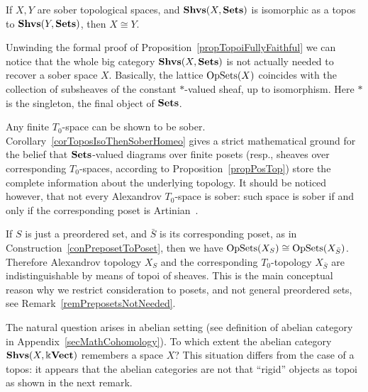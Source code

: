 \begin{cor}\label{corToposIsoThenSoberHomeo}
If $X,Y$ are sober topological spaces, and $\mathbf{Shvs}(X,\mathbf{Sets})$ is isomorphic as a topos to $\mathbf{Shvs}(Y,\mathbf{Sets})$, then $X\cong Y$.
\end{cor}

\begin{rem}\label{remRecoverXfromTopos}
Unwinding the formal proof of Proposition~\ref{propTopoiFullyFaithful} we can notice that the whole big category $\mathbf{Shvs}(X,\mathbf{Sets})$ is not actually needed to recover a sober space $X$. Basically, the lattice $\operatorname{OpSets}(X)$ coincides with the collection of subsheaves of the constant $\ast$-valued sheaf, up to isomorphism. Here $\ast$ is the singleton, the final object of $\mathbf{Sets}$.
\end{rem}

\begin{rem}\label{remFiniteT0SpaceSetSheaves}
Any finite $T_0$-space can be shown to be sober. Corollary~\ref{corToposIsoThenSoberHomeo} gives a strict mathematical ground for the belief that $\mathbf{Sets}$-valued diagrams over finite posets (resp., sheaves over corresponding $T_0$-spaces, according to Proposition~\ref{propPosTop}) store the complete information about the underlying topology. It should be noticed however, that not every Alexandrov $T_0$-space is sober: such space is sober if and only if the corresponding poset is Artinian~\cite[Thm.C.6]{Lindenhovius}.
\end{rem}

\begin{rem}\label{remPreposetsNotNeededLocalic}
If $S$ is just a preordered set, and $\bar{S}$ is its corresponding poset, as in Construction~\ref{conPreposetToPoset}, then we have $\operatorname{OpSets}(X_S)\cong \operatorname{OpSets}(X_{\bar{S}})$. Therefore Alexandrov topology $X_S$ and the corresponding $T_0$-topology $X_{\bar{S}}$ are indistinguishable by means of topoi of sheaves. This is the main conceptual reason why we restrict consideration to posets, and not general preordered sets, see Remark~\ref{remPreposetsNotNeeded}.
\end{rem}

The natural question arises in abelian setting (see definition of abelian category in Appendix~\ref{secMathCohomology}). To which extent the abelian category $\mathbf{Shvs}(X,\Bbbk\mathbf{Vect})$ remembers a space $X$? This situation differs from the case of a topos: it appears that the abelian categories are not that ``rigid'' objects as topoi as shown in the next remark.

